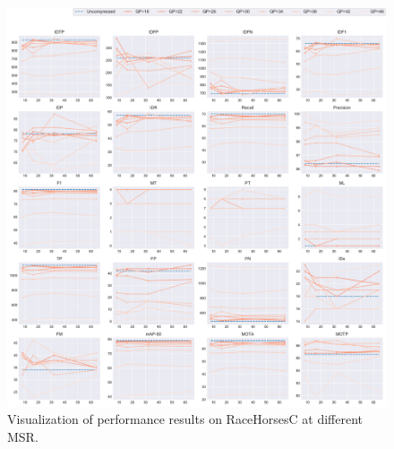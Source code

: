 \begin{figure}[!htbp]
\centering
\includegraphics[width=1.0\linewidth]{img/appendix/RaceHorsesC_all_multiplots_msr.pdf}
\caption[Visualization of performance results on RaceHorsesC at different MSR]
{Visualization of performance results on RaceHorsesC at different MSR.}
\label{fig:RaceHorsesC_all_msr}
\end{figure}



